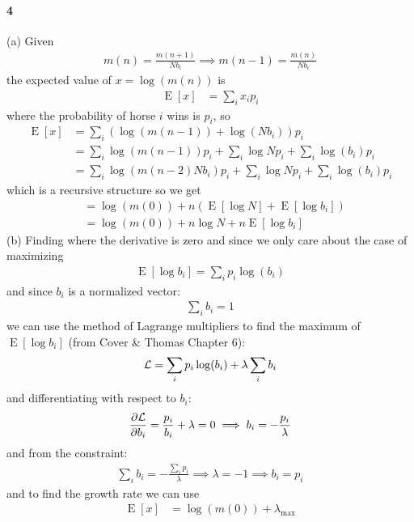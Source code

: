 \documentclass[../main.tex]{subfiles}
\newcommand{\E}{\operatorname{E}}
\begin{document}
\paragraph*{4} (a) Given
\begin{align*}
    m(n) = \frac{m(n+1)}{N b_i} \implies m(n - 1) = \frac{m(n)}{N b_i}
\end{align*}
the expected value of $x = \log(m(n))$ is
\begin{align*}
    \E[x] &= \sum_i x_i p_i
\end{align*}
where the probability of horse $i$ wins is $p_i$, so 
\begin{align*}
    \E[x] &= \sum_i (\log(m(n - 1)) + \log(N b_i)) p_i \\
    &= \sum_i \log(m(n - 1)) p_i +  \sum_i \log N p_i + \sum_i \log(b_i) p_i \\
    &= \sum_i \log(m(n - 2) N b_i) p_i + \sum_i \log N p_i + \sum_i \log(b_i) p_i
\end{align*}
which is a recursive structure so we get
\begin{align*}
    &= \log(m(0)) + n (\E[\log N] + \E[\log b_i]) \\
    &= \log(m(0)) + n \log N + n \E[\log b_i] 
\end{align*}
(b) Finding where the derivative is zero and since we only care about the case of maximizing
\begin{align*}
    \E[\log b_i] = \sum_i p_i \log(b_i)
\end{align*}
and since $b_i$ is a normalized vector:
\begin{align*}
    \sum_i b_i = 1
\end{align*}
we can use the method of Lagrange multipliers to find the maximum of $\E[\log b_i]$
(from Cover \& Thomas Chapter 6):
\begin{align*}
    \mathcal{L} = \sum_i p_i \log(b_i) + \lambda \sum_i b_i
\end{align*}
and differentiating with respect to $b_i$:
\begin{align*}
    \pdv{\mathcal{L}}{b_i} = \frac{p_i}{b_i} + \lambda = 0 \implies b_i = -\frac{p_i}{\lambda}
\end{align*}
and from the constraint:
\begin{align*}
    \sum_i b_i = -\frac{\sum_i p_i}{\lambda} \implies \lambda = -1 \implies b_i = p_i
\end{align*}
and to find the growth rate we can use
\begin{align*}
    \E[x] &= \log(m(0)) + \lambda_{\text{max}}
\end{align*}
\end{document}
